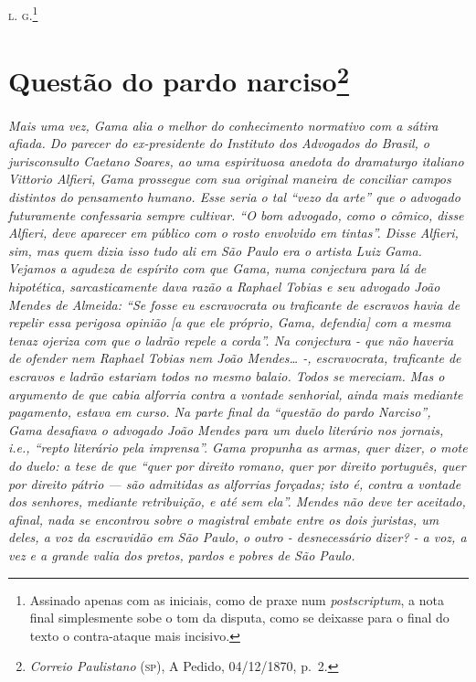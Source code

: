 {\textsc{l. g.}\footnote{ Assinado apenas com as iniciais, como de praxe num
  \emph{postscriptum}, a nota final simplesmente sobe o tom da disputa,
  como se deixasse para o final do texto o contra-ataque mais incisivo.}

\chapter{Questão do pardo narciso\footnote{\emph{Correio Paulistano} (\textsc{sp}), A Pedido, 04/12/1870,
  p.~2.}} %

\begin{didascalia}
\emph{Mais uma vez, Gama alia o melhor do conhecimento normativo com a
sátira afiada. Do parecer do ex-presidente do Instituto dos Advogados do
Brasil, o jurisconsulto Caetano Soares, ao uma espirituosa anedota do
dramaturgo italiano Vittorio Alfieri, Gama prossegue com sua original
maneira de conciliar campos distintos do pensamento humano. Esse seria o
tal ``vezo da arte'' que o advogado futuramente confessaria sempre
cultivar. ``O bom advogado, como o cômico, disse Alfieri, deve aparecer
em público com o rosto envolvido em tintas''. Disse Alfieri, sim, mas
quem dizia isso tudo ali em São Paulo era o artista Luiz Gama. Vejamos a
agudeza de espírito com que Gama, numa conjectura para lá de hipotética,
sarcasticamente dava razão a Raphael Tobias e seu advogado João Mendes
de Almeida: ``Se fosse eu escravocrata ou traficante de escravos havia de
repelir essa perigosa opinião {[}a que ele próprio, Gama, defendia{]}
com a mesma tenaz ojeriza com que o ladrão repele a corda''. Na
conjectura - que não haveria de ofender nem Raphael Tobias nem João
Mendes\ldots{} -, escravocrata, traficante de escravos e ladrão estariam
todos no mesmo balaio. Todos se mereciam. Mas o argumento de que cabia
alforria contra a vontade senhorial, ainda mais mediante pagamento,
estava em curso. Na parte final da ``questão do pardo Narciso'', Gama
desafiava o advogado João Mendes para um duelo literário nos jornais,
i.e., ``repto literário pela imprensa''. Gama propunha as armas, quer
dizer, o mote do duelo: a tese de que ``quer por direito romano, quer por
direito português, quer por direito pátrio --- são admitidas as
alforrias forçadas; isto é, contra a vontade dos senhores, mediante
retribuição, e até sem ela''. Mendes não deve ter aceitado, afinal, nada
se encontrou sobre o magistral embate entre os dois juristas, um deles,
a voz da escravidão em São Paulo, o outro - desnecessário dizer? - a
voz, a vez e a grande valia dos pretos, pardos e pobres de São Paulo.}
\end{didascalia}

}
